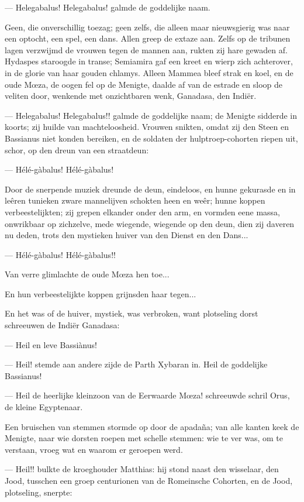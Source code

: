 \documentclass[a4paper, 12pt, oneside, dutch]{article}
\begin{document}
--- Helegabalus! Helegabalus! galmde de goddelijke naam.

Geen, die onverschillig toezag; geen zelfs, die alleen maar nieuwsgierig was naar een optocht, een spel, een dans. Allen greep de extaze aan. Zelfs op de tribunen lagen verzwijmd de vrouwen tegen de mannen aan, rukten zij hare gewaden af. Hydaspes staroogde in transe; Semiamira gaf een kreet en wierp zich achterover, in de glorie van haar gouden chlamys. Alleen Mammea bleef strak en koel, en de oude Mœza, de oogen fel op de Menigte, daalde af van de estrade en sloop de veliten door, wenkende met onzichtbaren wenk, Ganadasa, den Indiër.

--- Helegabalus! Helegabalus!! galmde de goddelijke naam; de Menigte sidderde in koorts; zij huilde van machteloosheid. Vrouwen snikten, omdat zij den Steen en Bassianus niet konden bereiken, en de soldaten der hulptroep-cohorten riepen uit, schor, op den dreun van een straatdeun:

--- Hélé-gàbalus! Hélé-gàbalus!

Door de snerpende muziek dreunde de deun, eindeloos, en hunne gekurasde en in leêren tunieken zware mannelijven schokten heen en weêr; hunne koppen verbeestelijkten; zij grepen elkander onder den arm, en vormden eene massa, onwrikbaar op zichzelve, mede wiegende, wiegende op den deun, dien zij daveren nu deden, trots den mystieken huiver van den Dienst en den Dans...

--- Hélé-gàbalus! Hélé-gàbalus!!

Van verre glimlachte de oude Mœza hen toe...

En hun verbeestelijkte koppen grijnsden haar tegen...

En het was of de huiver, mystiek, was verbroken, want plotseling dorst schreeuwen de Indiër Ganadasa:

--- Heil en leve Bassiànus!

--- Heil! stemde aan andere zijde de Parth Xybaran in. Heil de goddelijke Bassianus!

--- Heil de heerlijke kleinzoon van de Eerwaarde Mœza! schreeuwde schril Orus, de kleine Egyptenaar.

Een bruischen van stemmen stormde op door de apadaña; van alle kanten keek de Menigte, naar wie dorsten roepen met schelle stemmen: wie te ver was, om te verstaan, vroeg wat en waarom er geroepen werd.

--- Heil!! bulkte de kroeghouder Matthias: hij stond naast den wisselaar, den Jood, tusschen een groep centurionen van de Romeinsche Cohorten, en de Jood, plotseling, snerpte:
\end{document}

